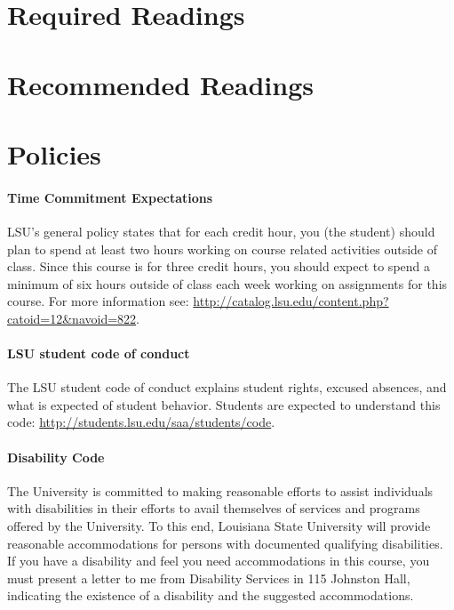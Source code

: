 \documentclass[11pt,article,oneside]{memoir}
\begin{document}
\section{Required Readings}
\vspace*{0.5cm}
\nocite{*}
\setlength{}
\printbibliography[keyword=required, heading=none]

\section{Recommended Readings}
\vspace*{0.5cm}
\nocite{*}
\setlength{}
\printbibliography[keyword=recommended, heading=none]

\section{Policies}

\paragraph{Time Commitment Expectations}
LSU's general policy states that for each credit hour, you (the student) should plan to
spend at least two hours working on course related activities outside of class. Since this course is for three credit hours, you should expect to spend a minimum of six hours outside of class each week working on assignments for this course. For more information see: 
\url{http://catalog.lsu.edu/content.php?catoid=12&navoid=822}.

\paragraph{LSU student code of conduct}
The LSU student code of conduct explains student rights, excused absences, and what is expected of student behavior. Students are expected to understand this code:  \url{http://students.lsu.edu/saa/students/code}.

\clearpage

\paragraph{Disability Code}
The University is committed to making reasonable efforts to assist individuals with disabilities in
their efforts to avail themselves of services and programs offered by the University. To this end,
Louisiana State University will provide reasonable accommodations for persons with
documented qualifying disabilities. If you have a disability and feel you need accommodations in
this course, you must present a letter to me from Disability Services in 115 Johnston Hall,
indicating the existence of a disability and the suggested accommodations.
\end{document}
